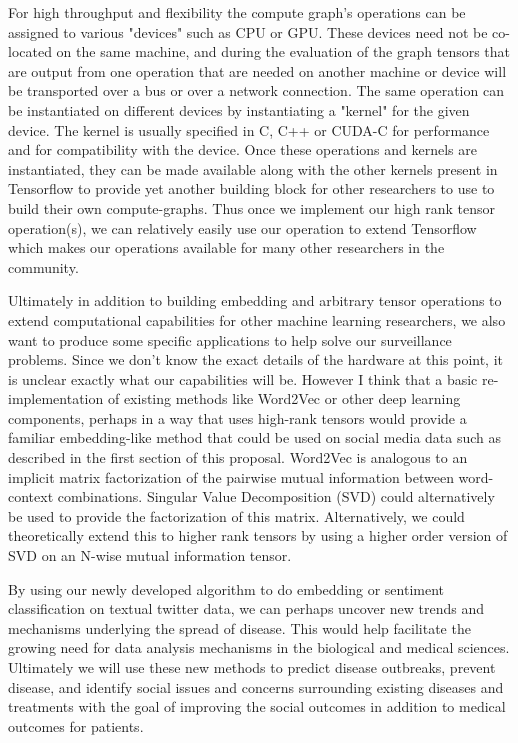 For high throughput and flexibility the compute graph's operations can be assigned to various "devices" such as CPU or GPU. These devices need not be co-located on the same machine, and during the evaluation of the graph tensors that are output from one operation that are needed on another machine or device will be transported over a bus or over a network connection. The same operation can be instantiated on different devices by instantiating a "kernel" for the given device. The kernel is usually specified in C, C++ or CUDA-C for performance and for compatibility with the device. Once these operations and kernels are instantiated, they can be made available along with the other kernels present in Tensorflow to provide yet another building block for other researchers to use to build their own compute-graphs. Thus once we implement our high rank tensor operation(s), we can relatively easily use our operation to extend Tensorflow which makes our operations available for many other researchers in the community.

Ultimately in addition to building embedding and arbitrary tensor operations to extend computational capabilities for other machine learning researchers, we also want to produce some specific applications to help solve our surveillance problems. Since we don't know the exact details of the hardware at this point, it is unclear exactly what our capabilities will be. However I think that a basic re-implementation of existing methods like Word2Vec or other deep learning components, perhaps in a way that uses high-rank tensors would provide a familiar embedding-like method that could be used on social media data such as described in the first section of this proposal. Word2Vec is analogous to an implicit matrix factorization of the pairwise mutual information between word-context combinations\cite{levy2014neural}. Singular Value Decomposition (SVD) could alternatively be used to provide the factorization of this matrix. Alternatively, we could theoretically extend this to higher rank tensors by using a higher order version of SVD on an N-wise mutual information tensor.

By using our newly developed algorithm to do embedding or sentiment classification on textual twitter data, we can perhaps uncover new trends and mechanisms underlying the spread of disease. This would help facilitate the growing need for data analysis mechanisms in the biological and medical sciences\cite{cichocki2014era}. Ultimately we will use these new methods to predict disease outbreaks, prevent disease, and identify social issues and concerns surrounding existing diseases and treatments with the goal of improving the social outcomes in addition to medical outcomes for patients.

